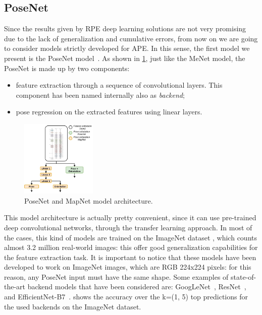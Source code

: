 \subsection{PoseNet}
Since the results given by RPE deep learning solutions are not very promising due to the lack of generalization and cumulative errors, from now on we are going to consider models strictly developed for APE.
In this sense, the first model we present is the PoseNet model~\cite{9348762}.
As shown in \cref{fig:mapnet-posenet-structure}, just like the MeNet model, the PoseNet is made up by two components:
\begin{itemize}
    \item feature extraction through a sequence of convolutional layers. This component has been named internally also as \emph{backend};
    \item pose regression on the extracted features using linear layers.
\end{itemize}

\begin{figure}[htbp]
    \begin{center}
        \includegraphics[width=0.32\textwidth]{./imgs/mapnet_posenet_structure.png}
    \end{center}
    \caption{PoseNet and MapNet model architecture.}
    \label{fig:mapnet-posenet-structure}
\end{figure}

This model architecture is actually pretty convenient, since it can use pre-trained deep convolutional networks, through the transfer learning approach. In most of the cases, this kind of models are trained on the ImageNet dataset \cite{imagenet}, which counts almost 3.2 million real-world images: this offer good generalization capabilities for the feature extraction task.
It is important to notice that these models have been developed to work on ImageNet images, which are RGB 224x224 pixels: for this reason, any PoseNet input must have the same shape. 
Some examples of state-of-the-art backend models that have been considered are: GoogLeNet~\cite{googlenet}, ResNet~\cite{resnet}, and EfficientNet-B7~\cite{efficientnet}.  shows the accuracy over the k=(1, 5) top predictions for the used backends on the ImageNet dataset.

